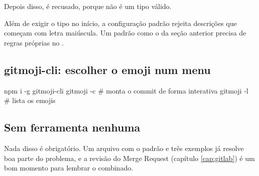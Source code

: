 Depois disso,  é recusado, porque  não é um tipo válido.

\begin{atencao}
Além de exigir o tipo no início, a configuração padrão rejeita descrições que começam com letra maiúscula. Um padrão como o da seção anterior precisa de regras próprias no .
\end{atencao}

\subsection*{gitmoji-cli: escolher o emoji num menu}

\begin{terminal}
npm i -g gitmoji-cli
gitmoji -c        # monta o commit de forma interativa
gitmoji -l        # lista os emojis
\end{terminal}

\subsection*{Sem ferramenta nenhuma}

Nada disso é obrigatório. Um arquivo  com o padrão e três exemplos já resolve boa parte do problema, e a revisão do Merge Request (capítulo \ref{cap:gitlab}) é um bom momento para lembrar o combinado.
